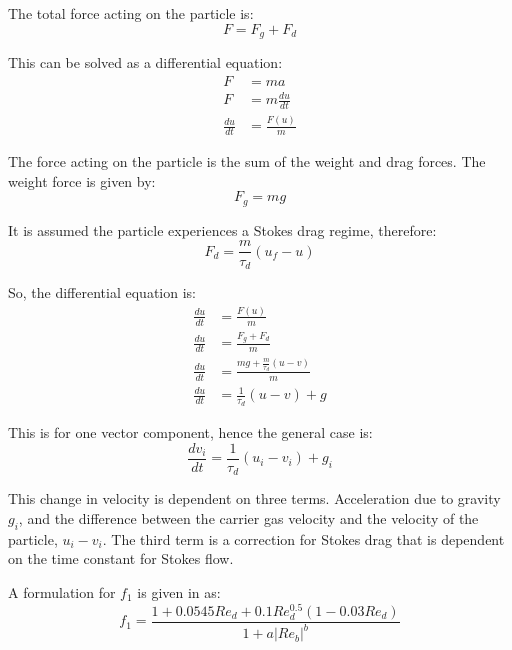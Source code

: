 \documentclass[../Interim_Report_Master]{subfiles}
\begin{document}
The total force acting on the particle is:
\begin{equation}
F = F_g + F_d
\end{equation}

This can be solved as a differential equation:
\begin{subequations}
	\begin{align}
	F &= ma \\
	F &= m\frac{du}{dt} \\
	\frac{du}{dt} &= \frac{F(u)}{m}
	\end{align}
\end{subequations}

The force acting on the particle is the sum of the weight and drag forces. The weight force is given by:
\begin{equation}
F_g = mg
\end{equation}

It is assumed the particle experiences a Stokes drag regime, therefore:
\begin{equation}
F_d = \frac{m}{\tau_d}(u_f-u)
\end{equation}

So, the differential equation is:
\begin{subequations}
	\begin{align}
	\frac{du}{dt} &= \frac{F(u)}{m} \\
	\frac{du}{dt} &= \frac{F_g + F_d}{m} \\
	\frac{du}{dt} &= \frac{mg + \frac{m}{\tau_d}(u-v)}{m} \\
	\frac{du}{dt} &= \frac{1}{\tau_d}(u-v) + g
	\end{align}
\end{subequations}

This is for one vector component, hence the general case is:
\begin{equation}
\frac{dv_i}{dt} = \frac{1}{\tau_d}(u_i-v_i) + g_i
\end{equation}

This change in velocity is dependent on three terms. Acceleration due to gravity \(g_{i}\), and the difference between the carrier gas velocity and the velocity of the particle, \(u_{i}-v_{i}\). The third term is a correction for Stokes drag that is dependent on the time constant for Stokes flow. 

A formulation for $f_1$ is given in \cite{Miller1998} as:
\begin{equation}
f_{1} = \frac{1+0.0545Re_{d}+0.1Re_{d}^{0.5}(1-0.03Re_{d})}{1+a|Re_{b}|^{b}}
\end{equation}
\end{document}
